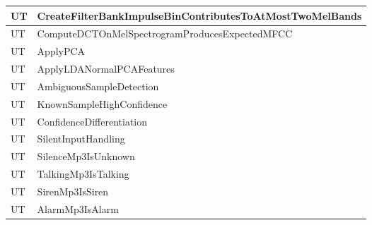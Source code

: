 \documentclass[12pt, titlepage]{article}
\newcounter{unitTest}
\newcommand{\mtheunitTest}{UT\theunitTest}
\begin{document}
{\begin{longtable}{|p{2cm}|p{11cm}|}
    {unitTest} \mtheunitTest
    \label{CreateFilterBankImpulseBinContributesToAtMostTwoMelBands} &
    CreateFilterBankImpulseBinContributesToAtMostTwoMelBands \\
    \hline

    {unitTest} \mtheunitTest
    \label{ComputeDCTOnMelSpectrogramProducesExpectedMFCC} &
    ComputeDCTOnMelSpectrogramProducesExpectedMFCC \\
    \hline

    {unitTest} \mtheunitTest \label{ApplyPCA} & ApplyPCA \\
    \hline

    {unitTest} \mtheunitTest \label{ApplyLDANormalPCAFeatures} &
    ApplyLDANormalPCAFeatures \\ \hline

    {unitTest} \mtheunitTest \label{AmbiguousSampleDetection} &
    AmbiguousSampleDetection \\ \hline
    {unitTest} \mtheunitTest \label{KnownSampleHighConfidence} &
    KnownSampleHighConfidence \\ \hline
    {unitTest} \mtheunitTest \label{ConfidenceDifferentiation} &
    ConfidenceDifferentiation \\ \hline
    {unitTest} \mtheunitTest \label{SilentInputHandling} &
    SilentInputHandling \\ \hline
    {unitTest} \mtheunitTest \label{SilenceMp3IsUnknown} &
    SilenceMp3IsUnknown \\ \hline
    {unitTest} \mtheunitTest \label{TalkingMp3IsTalking} &
    TalkingMp3IsTalking \\ \hline
    {unitTest} \mtheunitTest \label{SirenMp3IsSiren} &
    SirenMp3IsSiren \\ \hline
    {unitTest} \mtheunitTest \label{AlarmMp3IsAlarm} &
    AlarmMp3IsAlarm \\ \hline


\end{longtable}}
\end{document}
